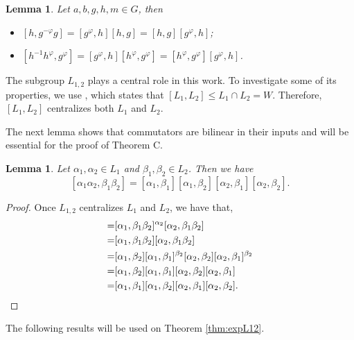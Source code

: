 \documentclass[12pt,leqno]{amsart}
\newtheorem{lem}[theorem]{\sc Lemma}
\begin{document}
\begin{lem}\cite[Lemma 4.1.6]{Sidki}\label{l1} 
    Let $a,b,g,h,m\in G$, then 
    \begin{itemize}
        \item[(i)] $[h,g^{-\varphi}g]=[g^{\varphi},h][h,g]=[h,g][g^{\varphi},h] $;
        \item[(ii)] $ [h^{-1}h^{\varphi},g^{\varphi}]=[g^{\varphi},h][h^{\varphi},g^{\varphi}]=[h^{\varphi},g^{\varphi}][g^{\varphi},h]$.
    \end{itemize}
\end{lem}

The subgroup $L_{1,2}$ plays a central role in this work. To investigate some of its properties, we use \cite[Lemma 4.1.10]{Sidki},  which states that $[L_1,L_2]\leq L_1\cap L_2=W$. Therefore, $[L_1,L_2]$ centralizes both $L_1$ and $L_2$.

The next lemma shows that commutators are bilinear in their inputs and will be essential for the proof of Theorem C.

\begin{lem}\label{lem:L12prod}
    Let $\alpha_1,\alpha_2\in L_1$ and $\beta_1,\beta_2\in L_2$. Then we have 
    \[
    [\alpha_1\alpha_2,\beta_1\beta_2]= [\alpha_1,\beta_1][\alpha_1,\beta_2][\alpha_2,\beta_1][\alpha_2,\beta_2].
    \]
\end{lem}
\begin{proof}
    Once $L_{1,2}$ centralizes $L_1$ and $L_2$, we have that,
    \begin{align*}
        [\alpha_1\alpha_2,\beta_1\beta_2]=&[\alpha_1,\beta_1\beta_2]^{\alpha_2}[\alpha_2,\beta_1\beta_2]\\
        =&[\alpha_1,\beta_1\beta_2][\alpha_2,\beta_1\beta_2]\\
        =&[\alpha_1,\beta_2][\alpha_1,\beta_1]^{\beta_2}[\alpha_2,\beta_2][\alpha_2,\beta_1]^{\beta_2}\\
        =&[\alpha_1,\beta_2][\alpha_1,\beta_1][\alpha_2,\beta_2][\alpha_2,\beta_1]\\
        =&[\alpha_1,\beta_1][\alpha_1,\beta_2][\alpha_2,\beta_1][\alpha_2,\beta_2]. \qedhere
    \end{align*}
\end{proof}

The following results will be used on Theorem \ref{thm:expL12}. 
\end{document}
